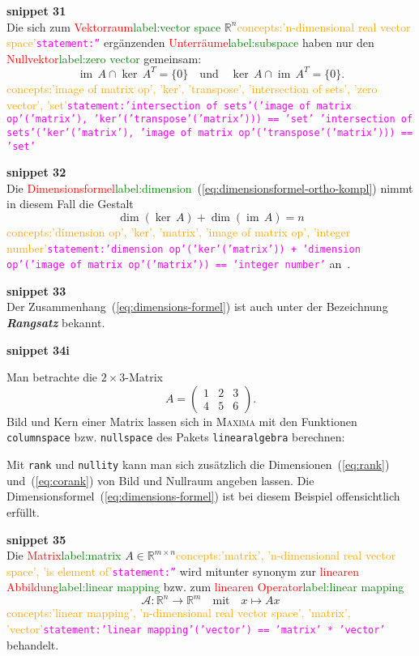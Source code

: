 \documentclass[a4paper,twoside,english,ngerman,deutsch,german,sectrefs,envcountsame,envcountchap]{svmono}
\newcommand{\setref}[2]{\textcolor{red}{#1}\textcolor{green}{#2}}
\newcommand{\snippet}[1]{\textbf{snippet #1}\\}
\newcommand{\eqnote}[2]{\textcolor{orange}{#1}\textcolor{magenta}{\texttt{#2}}}
\begin{document}
\snippet{31}
Die sich zum \setref{Vektorraum}{label:vector space} ${\mathbb{R}}^{n}$\eqnote{concepts:'n-dimensional real vector space'}{statement:''} ergänzenden \setref{Unterräume}{label:subspace} haben nur den \setref{Nullvektor}{label:zero vector} gemeinsam:
\[
{\operatorname{im}}\,A\cap\ker\,A^{T}=\{0\}\quad\text{und}\quad\ker\,A\cap{\operatorname{im}}\,A^{T}=\{0\}.
\]\eqnote{concepts:'image of matrix op', 'ker', 'transpose', 'intersection of sets', 'zero vector', 'set'}{statement:'intersection of sets'('image of matrix op'('matrix'), 'ker'('transpose'('matrix'))) == 'set'
'intersection of sets'('ker'('matrix'), 'image of matrix op'('transpose'('matrix'))) == 'set'}

\snippet{32}
Die \setref{Dimensionsformel}{label:dimension}~(\eqref{eq:dimensionsformel-ortho-kompl}) nimmt in diesem Fall die Gestalt
\begin{equation}
\dim(\ker\,A)+\dim({\operatorname{im}}\,A)=n\label{eq:dimensions-formel}
\end{equation}\eqnote{concepts:'dimension op', 'ker', 'matrix', 'image of matrix op', 'integer number'}{statement:'dimension op'('ker'('matrix')) + 'dimension op'('image of matrix op'('matrix')) == 'integer number'}
an~\cite{lorenz1992,beutelspacher2001}.

\snippet{33}
Der Zusammenhang~(\eqref{eq:dimensions-formel}) ist auch unter der Bezeichnung \textbf{\em Rangsatz} bekannt.

\snippet{34i}


\begin{example}
\label{exa:Bild-und-Kern}Man betrachte die $2\times3$-Matrix
\[
A=\left(\begin{array}{ccc} 1 & 2 & 3\\ 4 & 5 & 6
\end{array}\right).
\]
Bild und Kern einer Matrix lassen sich in \textsc{Maxima} mit den Funktionen \texttt{columnspace} bzw. \texttt{nullspace} des Pakets
\texttt{linearalgebra} berechnen:



Mit \texttt{rank} und \texttt{nullity} kann man sich zusätzlich die Dimensionen~(\eqref{eq:rank}) und~(\eqref{eq:corank}) von Bild und Nullraum angeben lassen. Die Dimensionsformel~(\eqref{eq:dimensions-formel}) ist bei diesem Beispiel offensichtlich erfüllt.

\end{example}


\snippet{35}
Die \setref{Matrix}{label:matrix} $A\in{\mathbb{R}}^{m\times n}$\eqnote{concepts:'matrix', 'n-dimensional real vector space', 'is element of'}{statement:''} wird mitunter synonym zur \setref{linearen Abbildung}{label:linear mapping} bzw. zum \setref{linearen Operator}{label:linear mapping}
\[
\mathcal{A}:{\mathbb{R}}^{n}\to{\mathbb{R}}^{m}\quad\text{mit}\quad x\mapsto Ax
\]\eqnote{concepts:'linear mapping', 'n-dimensional real vector space', 'matrix', 'vector'}{statement:'linear mapping'('vector') == 'matrix' * 'vector'}
behandelt.
\end{document}
